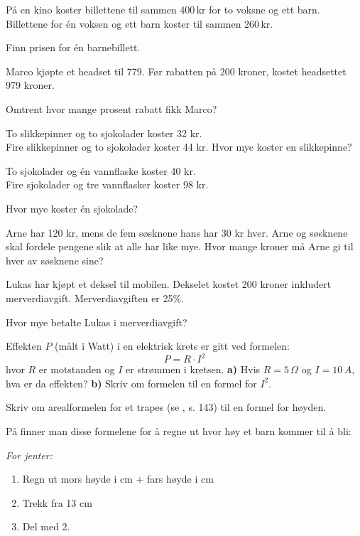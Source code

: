 På en kino koster billettene til sammen 400\,kr for to voksne og ett barn. Billettene for én voksen og ett barn koster til sammen 260\,kr.\os

Finn prisen for én barnebillett.

Marco kjøpte et headset til 779. Før rabatten på 200 kroner, kostet headsettet 979 kroner.\os

Omtrent hvor mange prosent rabatt fikk Marco?

To slikkepinner og to sjokolader koster 32 kr.\\
Fire slikkepinner og to sjokolader koster 44 kr.\os
Hvor mye koster en slikkepinne?

To sjokolader og én vannflaske koster 40 kr.\\
Fire sjokolader og tre vannflasker koster 98 kr.\os

Hvor mye koster én sjokolade?


\newpage


Arne har 120 kr, mens de fem søsknene hans har 30 kr hver. Arne og søsknene skal fordele pengene slik at alle har like mye. Hvor mange kroner må Arne gi til hver av søsknene sine?

Lukas har kjøpt et deksel til mobilen. Dekselet kostet 200 kroner inkludert
merverdiavgift. Merverdiavgiften er 25\%. \os

Hvor mye betalte Lukas i merverdiavgift?


Effekten $ P $ (målt i Watt) i en elektrisk krets er gitt ved formelen:
\[ P=R\cdot I^2 \]
hvor $ R $ er motstanden og $ I $ er strømmen i kretsen.\os
\textbf{a)} Hvis $ {R=5\,\Omega} $ og $ {I=10\,A} $, hva er da effekten?\os
\textbf{b)} Skriv om formelen til en formel for $ I^2 $.

Skriv om arealformelen for et trapes (se \mb, s. 143) til en formel for høyden.


På
 finner man disse formelene for å regne ut hvor høy et barn kommer til å bli:\os

\textit{For jenter:}
\begin{enumerate}
	\item Regn ut mors høyde i cm + fars høyde i cm
	\item Trekk fra 13 cm
	\item Del med 2.
\end{enumerate}

